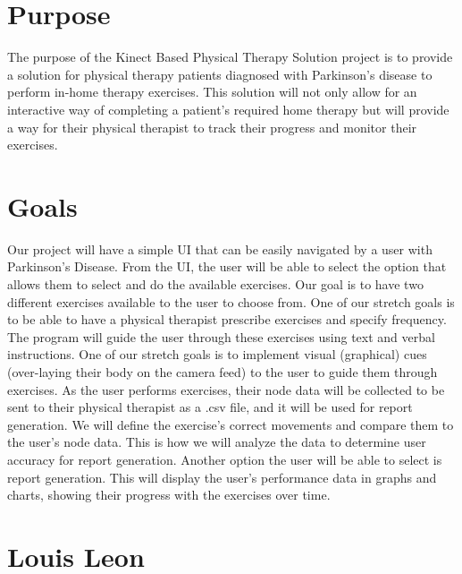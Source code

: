 \documentclass[onecolumn, draftclsnofoot,10pt, compsoc]{IEEEtran}
\begin{document}
\section{Purpose}
The purpose of the Kinect Based Physical Therapy Solution project is to provide a solution for physical therapy patients diagnosed with Parkinson's disease to perform in-home therapy exercises. This solution will not only allow for an interactive way of completing a patient's required home therapy but will provide a way for their physical therapist to track their progress and monitor their exercises.

\section{Goals}
Our project will have a simple UI that can be easily navigated by a user with Parkinson's Disease. From the UI, the user will be able to select the option that allows them to select and do the available exercises. Our goal is to have two different exercises available to the user to choose from. One of our stretch goals is to be able to have a physical therapist prescribe exercises and specify frequency. The program will guide the user through these exercises using text and verbal instructions. One of our stretch goals is to implement visual (graphical) cues (over-laying their body on the camera feed) to the user to guide them through exercises. As the user performs exercises, their node data will be collected to be sent to their physical therapist as a .csv file, and it will be used for report generation. We will define the exercise's correct movements and compare them to the user's node data. This is how we will analyze the data to determine user accuracy for report generation. Another option the user will be able to select is report generation. This will display the user's performance data in graphs and charts, showing their progress with the exercises over time. 

\section{Louis Leon}
\end{document}
